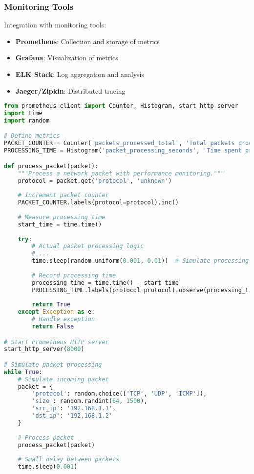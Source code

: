 \subsubsection{Monitoring Tools}
Integration with monitoring tools:

\begin{itemize}
    \item \textbf{Prometheus}: Collection and storage of metrics
    \item \textbf{Grafana}: Visualization of metrics
    \item \textbf{ELK Stack}: Log aggregation and analysis
    \item \textbf{Jaeger/Zipkin}: Distributed tracing
\end{itemize}

\begin{lstlisting}[language=python, caption=Prometheus Metrics Example]
from prometheus_client import Counter, Histogram, start_http_server
import time
import random

# Define metrics
PACKET_COUNTER = Counter('packets_processed_total', 'Total packets processed', ['protocol'])
PROCESSING_TIME = Histogram('packet_processing_seconds', 'Time spent processing packets', ['protocol'])

def process_packet(packet):
    """Process a network packet with performance monitoring."""
    protocol = packet.get('protocol', 'unknown')
    
    # Increment packet counter
    PACKET_COUNTER.labels(protocol=protocol).inc()
    
    # Measure processing time
    start_time = time.time()
    
    try:
        # Actual packet processing logic
        # ...
        time.sleep(random.uniform(0.001, 0.01))  # Simulate processing
        
        # Record processing time
        processing_time = time.time() - start_time
        PROCESSING_TIME.labels(protocol=protocol).observe(processing_time)
        
        return True
    except Exception as e:
        # Handle exception
        return False

# Start Prometheus HTTP server
start_http_server(8000)

# Simulate packet processing
while True:
    # Simulate incoming packet
    packet = {
        'protocol': random.choice(['TCP', 'UDP', 'ICMP']),
        'size': random.randint(64, 1500),
        'src_ip': '192.168.1.1',
        'dst_ip': '192.168.1.2'
    }
    
    # Process packet
    process_packet(packet)
    
    # Small delay between packets
    time.sleep(0.001)
\end{lstlisting}

